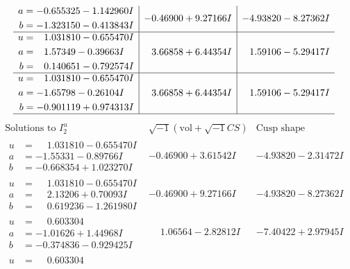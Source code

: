 \documentclass[1p]{elsarticle_modified}
\theoremstyle{definition}
\newcommand{\I}{\sqrt{-1}}
\begin{document}
$$\begin{array}{c|c|c}
\begin{aligned}
a &= -0.655325 - 1.142960 I \\
b &= -1.323150 - 0.413843 I\end{aligned}
 & -0.46900 + 9.27166 I & -4.93820 - 8.27362 I \\ \hline\begin{aligned}
u &= \phantom{-}1.031810 - 0.655470 I \\
a &= \phantom{-}1.57349 - 0.39663 I \\
b &= \phantom{-}0.140651 - 0.792574 I\end{aligned}
 & \phantom{-}3.66858 + 6.44354 I & \phantom{-}1.59106 - 5.29417 I \\ \hline\begin{aligned}
u &= \phantom{-}1.031810 - 0.655470 I \\
a &= -1.65798 - 0.26104 I \\
b &= -0.901119 + 0.974313 I\end{aligned}
 & \phantom{-}3.66858 + 6.44354 I & \phantom{-}1.59106 - 5.29417 I\\
 \hline 
 \end{array}$$\newpage$$\begin{array}{c|c|c}  
\text{Solutions to }I^u_{2}& \I (\text{vol} + \sqrt{-1}CS) & \text{Cusp shape}\\
 \hline 
\begin{aligned}
u &= \phantom{-}1.031810 - 0.655470 I \\
a &= -1.55331 - 0.89766 I \\
b &= -0.668354 + 1.023270 I\end{aligned}
 & -0.46900 + 3.61542 I & -4.93820 - 2.31472 I \\ \hline\begin{aligned}
u &= \phantom{-}1.031810 - 0.655470 I \\
a &= \phantom{-}2.13206 + 0.70093 I \\
b &= \phantom{-}0.619236 - 1.261980 I\end{aligned}
 & -0.46900 + 9.27166 I & -4.93820 - 8.27362 I \\ \hline\begin{aligned}
u &= \phantom{-}0.603304\phantom{ +0.000000I} \\
a &= -1.01626 + 1.44968 I \\
b &= -0.374836 - 0.929425 I\end{aligned}
 & \phantom{-}1.06564 - 2.82812 I & -7.40422 + 2.97945 I \\ \hline\begin{aligned}
u &= \phantom{-}0.603304\phantom{ +0.000000I} \\

\end{aligned}
\end{array}$$
\end{document}
